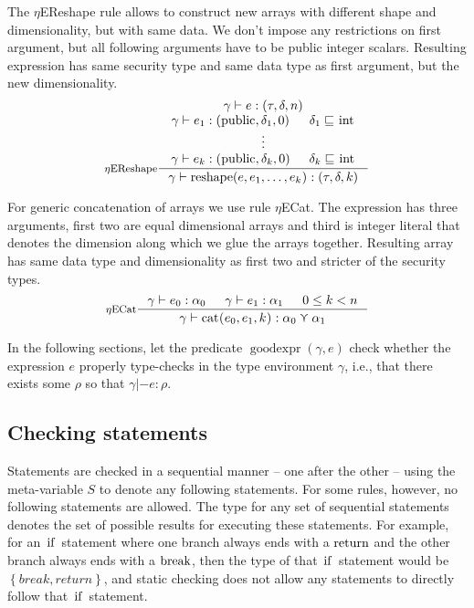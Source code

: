 \documentclass[a4paper, 10pt, draft]{report}
\newcommand{\mycode}[1]{\ensuremath{\mbox{\lstinline{#1}}}}
\begin{document}
The $\eta$EReshape rule allows to construct new arrays with different shape and
dimensionality, but with same data. We don't impose any restrictions on first
argument, but all following arguments have to be public integer scalars.
Resulting expression has same security type and same data type as first
argument, but the new dimensionality.
\[ \inference[$\eta$EReshape]
{
  \gamma |- e : \left(\tau, \delta, n\right) \\
  \gamma |- e_1 : \left(\mycode{public}, \delta_1, 0\right) & \delta_1 \sqsubseteq \mycode{int} \\
  \vdots \\
  \gamma |- e_k : \left(\mycode{public}, \delta_k, 0\right) & \delta_k \sqsubseteq \mycode{int}     }
{
  \gamma |- \mycode{reshape(} e , e_1, \ldots, e_k \mycode{)} : \left(\tau, \delta, k\right)
} \]

For generic concatenation of arrays we use rule $\eta$ECat. The expression has
three arguments, first two are equal dimensional arrays and third is integer
literal that denotes the dimension along which we glue the arrays together.
Resulting array has same data type and dimensionality as first two and stricter
of the security types.
\[ \inference[$\eta$ECat]
{
  \gamma |- e_0 : \alpha_0 &
  \gamma |- e_1 : \alpha_1 &
  0 \leq k < n
} 
{
  \gamma |- \mycode{cat(} e_0 , e_1, k \mycode{)} : \alpha_0 \curlyvee \alpha_1
} \]


In the following sections, let the predicate
$\operatorname{goodexpr}\!\left(\gamma, e\right)$ check whether the expression
$e$ properly type-checks in the type environment $\gamma$, i.e., that there
exists some $\rho$ so that $\gamma |- e : \rho$.

\subsection{Checking statements}\label{sec:checking:typing:statements}

Statements are checked in a sequential manner -- one after the other -- using
the meta-variable $S$ to denote any following statements. For some rules,
however, no following statements are allowed. The type for any set of
sequential statements denotes the set of possible results for executing these
statements. For example, for an \mycode{if} statement where one branch always
ends with a \mycode{return} and the other branch always ends with a
\mycode{break}, then the type of that \mycode{if} statement would be
$\left\{break, return\right\}$, and static checking does not allow any
statements to directly follow that \mycode{if} statement.
\end{document}
